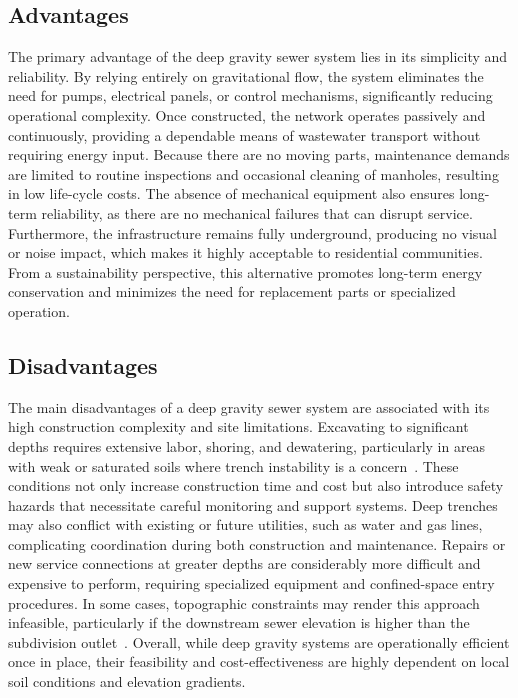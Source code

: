 \subsection{Advantages}
The primary advantage of the deep gravity sewer system lies in its simplicity and reliability. By relying entirely on gravitational flow, the system eliminates the need for pumps, electrical panels, or control mechanisms, significantly reducing operational complexity. Once constructed, the network operates passively and continuously, providing a dependable means of wastewater transport without requiring energy input. Because there are no moving parts, maintenance demands are limited to routine inspections and occasional cleaning of manholes, resulting in low life-cycle costs. The absence of mechanical equipment also ensures long-term reliability, as there are no mechanical failures that can disrupt service. Furthermore, the infrastructure remains fully underground, producing no visual or noise impact, which makes it highly acceptable to residential communities. From a sustainability perspective, this alternative promotes long-term energy conservation and minimizes the need for replacement parts or specialized operation.

\subsection{Disadvantages}
The main disadvantages of a deep gravity sewer system are associated with its high construction complexity and site limitations. Excavating to significant depths requires extensive labor, shoring, and dewatering, particularly in areas with weak or saturated soils where trench instability is a concern~\cite{Geotech_Colebrooke_2022}. These conditions not only increase construction time and cost but also introduce safety hazards that necessitate careful monitoring and support systems. Deep trenches may also conflict with existing or future utilities, such as water and gas lines, complicating coordination during both construction and maintenance. Repairs or new service connections at greater depths are considerably more difficult and expensive to perform, requiring specialized equipment and confined-space entry procedures. In some cases, topographic constraints may render this approach infeasible, particularly if the downstream sewer elevation is higher than the subdivision outlet~\cite{MDEQ_DesignGuidance_2025}. Overall, while deep gravity systems are operationally efficient once in place, their feasibility and cost-effectiveness are highly dependent on local soil conditions and elevation gradients.

